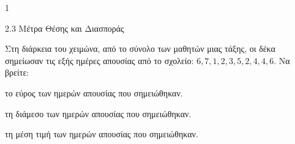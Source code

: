 \begin{ylh}{1}
    \item 2.3 Μέτρα Θέσης και Διασποράς
\end{ylh}
Στη διάρκεια του χειμώνα, από το σύνολο των μαθητών μιας τάξης, οι δέκα σημείωσαν τις εξής ημέρες απουσίας από το σχολείο: $6, 7, 1, 2, 3, 5, 2, 4, 4, 6$. Να βρείτε:
\begin{alist}
    \item το εύρος των ημερών απουσίας που σημειώθηκαν. 
    \item τη διάμεσο των ημερών απουσίας που σημειώθηκαν. 
    \item τη μέση τιμή των ημερών απουσίας που σημειώθηκαν. 
\end{alist}

